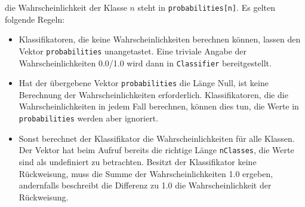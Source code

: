 \begin{itemize}
die Wahrscheinlichkeit der Klasse $n$ steht in \verb+probabilities[n]+. Es gelten folgende Regeln:
\begin{itemize}
\item Klassifikatoren, die keine Wahrscheinlichkeiten berechnen können, lassen den Vektor
\verb+probabilities+ unangetastet. Eine triviale Angabe der Wahrscheinlichkeiten 0.0/1.0 wird
dann in \verb+Classifier+ bereitgestellt.
\item Hat der übergebene Vektor \verb+probabilities+ die Länge Null, ist keine Berechnung 
der Wahrscheinlichkeiten erforderlich. Klassifikatoren, die die Wahrscheinlichkeiten in jedem Fall 
berechnen, können dies tun, die Werte in \verb+probabilities+ werden aber ignoriert.
\item Sonst berechnet der Klassifikator die Wahrscheinlichkeiten für alle Klassen. Der Vektor hat 
beim Aufruf bereits die richtige Länge \verb+nClasses+, die Werte sind als undefiniert zu betrachten.
Besitzt der Klassifikator keine Rückweisung, muss die Summe der Wahrscheinlichkeiten 1.0 ergeben, 
andernfalls beschreibt die Differenz zu 1.0 die Wahrscheinlichkeit der Rückweisung.
\end{itemize}
\end{itemize}
